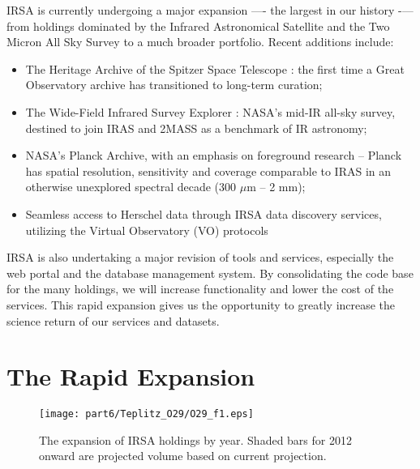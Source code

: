 IRSA is currently undergoing a major expansion —- the largest in our history -— from holdings dominated by the Infrared Astronomical Satellite \citep[IRAS][]{neugebauer84} and the Two Micron All Sky Survey \citep[2MASS][]{skrutskie06} to a much broader portfolio. Recent additions include:

\begin{itemize}

\item The Heritage Archive of the Spitzer Space Telescope \citep[SHA][]{werner04}: the first time a Great Observatory archive has transitioned to long-term curation; 
\item The Wide-Field Infrared Survey Explorer \citep[WISE][]{wright10}: NASA’s mid-IR all-sky survey, destined to join IRAS and 2MASS as a benchmark of IR astronomy; 
\item NASA's Planck Archive, with an emphasis on foreground research -- Planck \citet{planck11} has spatial resolution, sensitivity and coverage comparable to IRAS in an otherwise unexplored spectral decade (300 $\mu$m – 2 mm); 
\item Seamless access to Herschel data through IRSA data discovery services, utilizing the Virtual Observatory (VO) protocols

\end{itemize}

IRSA is also undertaking a major revision of tools and services, especially the web portal and the database management system. By consolidating the code base for the many holdings, we will increase functionality and lower the cost of the services. This rapid expansion gives us the opportunity to greatly increase the science return of our services and datasets.

\section{The Rapid Expansion}

\begin{figure}[t]

\centering
\texttt{[image: part6/Teplitz\_O29/O29\_f1.eps]}
\caption{The expansion of IRSA holdings by year.  Shaded  bars for 2012 onward are projected volume based on current projection.}

\end{figure}


